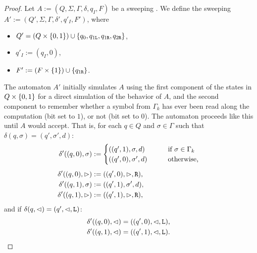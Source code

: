 \begin{proof}
	\newcommand{\ql}{q_{1\mathtt{L}}}
	\newcommand{\qr}{q_{1\mathtt{R}}}
	\newcommand{\qqr}{q_{2\mathtt{R}}}

	Let $A:=(Q,\Sigma,\Gamma,\delta,q_I,F)$ be a sweeping \kDLA.
	We define the sweeping \kDLA $A':=(Q',\Sigma,\Gamma,\delta',q'_I,F')$, where
	\begin{itemize}
		\item $Q'=(Q\times\set{0,1})\cup\set{q_0,\ql,\qr,\qqr}$,
		\item $q'_I:=(q_I,0)$,
		\item $F':=(F\times\set{1})\cup\set{\qr}$.
	\end{itemize}

	The automaton $A'$ initially simulates $A$ using the first component of the states in $Q\times\{0,1\}$ for a direct simulation of the behavior of $A$, and the second component to remember whether a symbol from $\Gamma_k$ has ever been read along the computation (bit set to $1$), or not (bit set to $0$).
	The automaton proceeds like this until $A$ would accept.
	That is, for each $q\in Q$ and $\sigma\in\Gamma$ such that $\delta(q,\sigma)=(q',\sigma',d)$:
	\begin{align*}
		\delta'((q,0),\sigma) & :=\begin{cases}
			                          ((q',1),\sigma,d) \qquad  & \text{if }\sigma\in\Gamma_k \\
			                          ((q',0),\sigma',d) \qquad & \text{otherwise,}
		                          \end{cases} \\[1ex]
		\delta'((q,0),\rhd)   & :=((q',0),\rhd,\mathtt R) \text,                                \\
		\delta'((q,1),\sigma) & :=((q',1),\sigma',d) \text,                               \\
		\delta'((q,1),\rhd)   & :=((q',1),\rhd,\mathtt R) \text,
	\end{align*}
	and if $\delta(q,\lhd)=(q',\lhd,\mathtt L)$:
	\begin{align*}
		\delta'((q,0),\lhd) & =((q',0),\lhd,\mathtt L) \text, \\
		\delta'((q,1),\lhd) & =((q',1),\lhd,\mathtt L) \text.
	\end{align*}


\end{proof}
